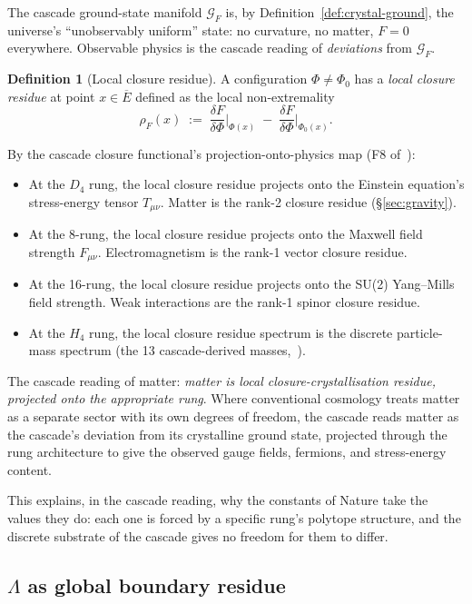 \documentclass[11pt]{article}
\theoremstyle{plain}
\theoremstyle{definition}
\newtheorem{definition}[theorem]{Definition}
\theoremstyle{remark}
\begin{document}
The cascade ground-state manifold $\mathcal{G}_F$ is, by Definition~\ref{def:crystal-ground}, the universe's ``unobservably uniform'' state: no curvature, no matter, $F = 0$ everywhere. Observable physics is the cascade reading of \emph{deviations} from $\mathcal{G}_F$.

\begin{definition}[Local closure residue]\label{def:local-residue}
A configuration $\Phi \ne \Phi_0$ has a \emph{local closure residue} at point $x \in \overline{E}$ defined as the local non-extremality
\[
  \rho_F(x) \;:=\; \frac{\delta F}{\delta \Phi}\bigl|_{\Phi(x)}
            \;-\; \frac{\delta F}{\delta \Phi}\bigl|_{\Phi_0(x)}.
\]
\end{definition}

By the cascade closure functional's projection-onto-physics map (F8 of~\citealp{SmartXXXVI}):
\begin{itemize}[leftmargin=2em]
\item At the $D_4$ rung, the local closure residue projects onto the Einstein equation's stress-energy tensor $T_{\mu\nu}$. Matter is the rank-2 closure residue (\S\ref{sec:gravity}).
\item At the 8-rung, the local closure residue projects onto the Maxwell field strength $F_{\mu\nu}$. Electromagnetism is the rank-1 vector closure residue.
\item At the 16-rung, the local closure residue projects onto the SU(2) Yang--Mills field strength. Weak interactions are the rank-1 spinor closure residue.
\item At the $H_4$ rung, the local closure residue spectrum is the discrete particle-mass spectrum (the 13 cascade-derived masses,~\citealp{SmartV}).
\end{itemize}

The cascade reading of matter: \emph{matter is local closure-crystallisation residue, projected onto the appropriate rung}. Where conventional cosmology treats matter as a separate sector with its own degrees of freedom, the cascade reads matter as the cascade's deviation from its crystalline ground state, projected through the rung architecture to give the observed gauge fields, fermions, and stress-energy content.

This explains, in the cascade reading, why the constants of Nature take the values they do: each one is forced by a specific rung's polytope structure, and the discrete substrate of the cascade gives no freedom for them to differ.

\subsection{$\Lambda$ as global boundary residue}\label{sec:cry-lambda}
\end{document}
